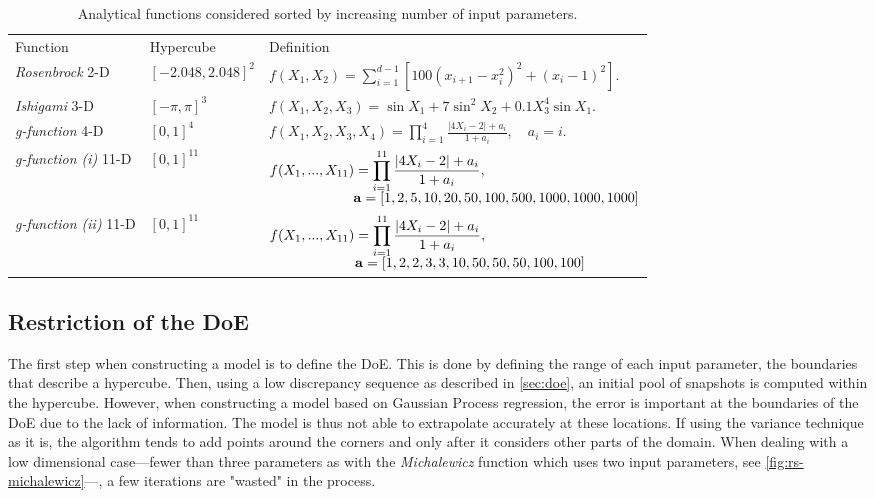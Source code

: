 \begin{table}[h]
\centering
\setcellgapes{5pt}
\makegapedcells
\begin{tabular}{lll}
\toprule
Function&Hypercube & Definition \\
\cmidrule{1-3}
\textit{Rosenbrock} 2-D& $[-2.048, 2.048]^2$ & $
f(X_1, X_2) = \sum_{i = 1}^{d-1}[100(x_{i+1} - x_i^2)^2  +(x_i -1)^2].$\\
\textit{Ishigami} 3-D& $[-\pi, \pi]^3$ & $ f(X_1, X_2, X_3) = \sin X_1 + 7 \sin^2 X_2 + 0.1 X_3^4 \sin X_1. $\\
\textit{g-function} 4-D& $[0, 1]^4$ & $
f(X_1, X_2, X_3, X_4) = \prod_{i=1}^4 \frac{\lvert 4X_i - 2\rvert + a_i}{1 + a_i}, \quad a_{i} = i.$\\
\textit{g-function (i)} 11-D & $[0, 1]^{11}$ & 
$\begin{multlined}[t][0.6\linewidth]
f(X_1, ..., X_{11}) = \prod_{i=1}^{11} \frac{\lvert 4X_i - 2\rvert + a_i}{1 + a_i},\\[-1ex]
\hspace{50pt} \mathbf{a} = [1, 2, 5, 10, 20, 50, 100, 500, 1000, 1000, 1000]\hfill
\end{multlined}$\\
\textit{g-function (ii)} 11-D & $[0, 1]^{11}$ &
$\begin{multlined}[t][0.6\linewidth]
f(X_1, ..., X_{11}) = \prod_{i=1}^{11} \frac{\lvert 4X_i - 2\rvert + a_i}{1 + a_i},\\[-1ex]
\hspace{51pt} \mathbf{a} = [1, 2, 2, 3, 3, 10, 50, 50, 50, 100, 100]\hfill
\end{multlined}$\\
\bottomrule
\end{tabular}
\caption{Analytical functions considered sorted by increasing number of input parameters.}
\label{tab:functions}
\end{table}

\subsection{Restriction of the DoE}
\label{sec:delta-space}

The first step when constructing a model is to define the DoE. This is done by defining the range of each input parameter, the boundaries that describe a hypercube. Then, using a low discrepancy sequence as described in \cref{sec:doe}, an initial pool of snapshots is computed within the hypercube. However, when constructing a model based on Gaussian Process regression, the error is important at the boundaries of the DoE due to the lack of information. The model is thus not able to extrapolate accurately at these locations. If using the variance technique as it is, the algorithm tends to add points around the corners and only after it considers other parts of the domain. When dealing with a low dimensional case---fewer than three parameters as with the \textit{Michalewicz} function which uses two input parameters, see \cref{fig:rs-michalewicz}---, a few iterations are "wasted" in the process.

